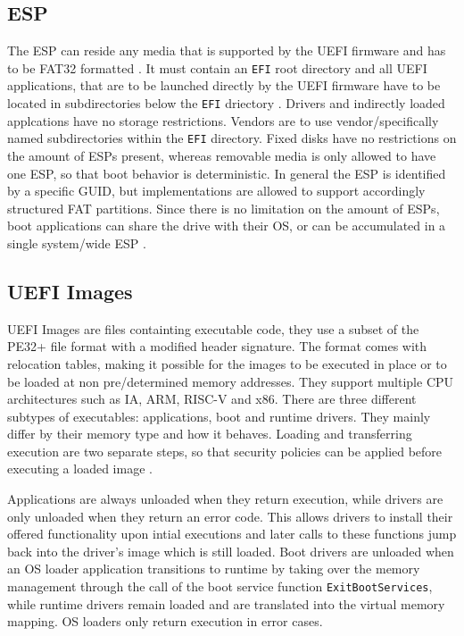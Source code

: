 \subsection{\acf{ESP}}

The \ac{ESP} can reside any media that is supported by the \ac{UEFI} firmware and has to be \ac{FAT}32 formatted \cite[Section 13.3]{uefi-spec}.
It must contain an \lstinline{EFI} root directory \cite[Section 13.3.1.3]{uefi-spec} and all \ac{UEFI} applications, that are to be launched directly by the \ac{UEFI} firmware have to be located in subdirectories below the \lstinline{EFI} driectory \cite[Section 13.3.1.3]{uefi-spec}. Drivers and indirectly loaded applcations have no storage restrictions. Vendors are to use vendor\-/specifically named subdirectories within the \lstinline{EFI} directory. Fixed disks have no restrictions on the amount of \acp{ESP} present, whereas removable media is only allowed to have one \ac{ESP}, so that boot behavior is deterministic. In general the \ac{ESP} is identified by a specific \ac{GUID}, but implementations are allowed to support accordingly structured \ac{FAT} partitions. Since there is no limitation on the amount of \acp{ESP}, boot applications can share the drive with their \ac{OS}, or can be accumulated in a single system\-/wide \ac{ESP} \cite[Section 13.3.3]{uefi-spec}.


\subsection{\acs{UEFI} Images}

\ac{UEFI} Images are files containting executable code, they use a subset of the \ac{PE32}+ file format with a modified header signature.
The format comes with relocation tables, making it possible for the images to be executed in place or to be loaded at non pre\-/determined memory addresses.
They support multiple CPU architectures such as IA, ARM, RISC-V and x86.
There are three different subtypes of executables: applications, boot and runtime drivers. They mainly differ by their memory type and how it behaves.
Loading and transferring execution are two separate steps, so that security policies can be applied before executing a loaded image \cite[Section 2.1.1]{uefi-spec}.

Applications are always unloaded when they return execution, while drivers are only unloaded when they return an error code. This allows drivers to install their offered functionality upon intial executions and later calls to these functions jump back into the driver's image which is still loaded.
Boot drivers are unloaded when an \ac{OS} loader application transitions to runtime by taking over the memory management through the call of the boot service function \lstinline{ExitBootServices}, while runtime drivers remain loaded and are translated into the virtual memory mapping. \ac{OS} loaders only return execution in error cases.


